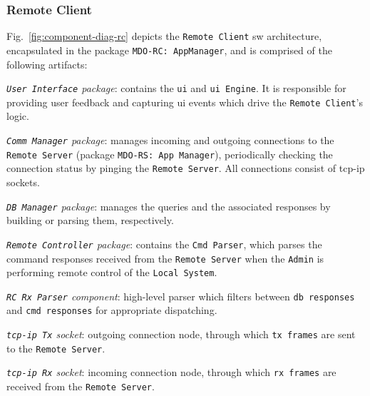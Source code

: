 \subsubsection{Remote Client}
\label{sec:remote-client-arch}
Fig.~\ref{fig:component-diag-rc} depicts the \texttt{Remote Client} \gls{sw} architecture, encapsulated in the package
\texttt{MDO-RC: AppManager}, and is comprised of the following artifacts:
\begin{item-c}
\item
  \emph{\texttt{User Interface} package}: contains the \texttt{\gls{ui}} and
  \texttt{\gls{ui} Engine}. It is responsible for providing user feedback and
  capturing \gls{ui} events which drive the \texttt{Remote Client}'s logic.
\item
  \emph{\texttt{Comm Manager} package}: manages incoming and outgoing
  connections to the \texttt{Remote Server} (package \texttt{MDO-RS: App Manager}), periodically checking the
  connection status by pinging the \texttt{Remote Server}. All connections
  consist of \gls{tcp-ip} sockets.
\item
  \emph{\texttt{DB Manager} package}: manages the queries and the associated
  responses by building or parsing them, respectively.
\item 
  \emph{\texttt{Remote Controller} package}: contains the \texttt{Cmd Parser},
  which parses the command responses received from the \texttt{Remote Server}
  when the \texttt{Admin} is performing remote control of the \texttt{Local
    System}.
\item
  \emph{\texttt{RC Rx Parser} component}: high-level parser which filters
  between \texttt{db responses} and \texttt{cmd responses} for appropriate
  dispatching.
\item
  \emph{\texttt{\gls{tcp-ip} Tx} socket}: outgoing connection node, through
  which \texttt{tx frames} are sent to the \texttt{Remote Server}.
\item 
  \emph{\texttt{\gls{tcp-ip} Rx} socket}:  incoming connection node, through
  which \texttt{rx frames} are received from the \texttt{Remote
    Server}.
\end{item-c}

